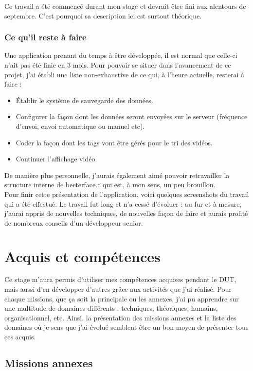 \documentclass[11pt,french,a4paper]{report}
\begin{document}
Ce travail a été commencé durant mon stage et devrait être fini aux alentours de septembre. C'est pourquoi sa description ici
est surtout théorique. \\
        \subsection{Ce qu'il reste à faire}
Une application prenant du temps à être développée, il est normal que celle-ci n'ait pas été finie en 3 mois. Pour pouvoir se situer
dans l'avancement de ce projet, j'ai établi une liste non-exhaustive de ce qui, à l'heure actuelle, resterai à faire : \\ 
\begin{itemize}
    \item Établir le système de sauvegarde des données.
    \item Configurer la façon dont les données seront envoyées sur le serveur (fréquence d'envoi, envoi automatique ou manuel etc).
    \item Coder la façon dont les tags vont être gérés pour le tri des vidéos. 
    \item Continuer l'affichage vidéo.
\end{itemize} 
De manière plus personnelle, j'aurais également aimé pouvoir retravailler la structure interne de beeterface.c qui est, à mon sens,
un peu brouillon. \\
Pour finir cette présentation de l'application, voici quelques screenshots du travail qui a été effectué.
Le travail fut long et n'a cessé d'évoluer : au fur et à mesure, j'aurai appris de nouvelles techniques, de nouvelles façon de faire 
et aurais profité de nombreux conseils d'un développeur senior. \\

\chapter{Acquis et compétences}
Ce stage m'aura permis d'utiliser mes compétences acquises pendant le DUT, mais aussi d'en développer d'autres grâce aux activités 
que j'ai réalisé. Pour chaque missions, que ça soit la principale ou les annexes, j'ai pu apprendre sur une multitude de domaines
différents : techniques, théoriques, humains, organisationnel, etc. 
Ainsi, la présentation des missions annexes et la liste des domaines où je sens que j'ai évolué semblent être un bon moyen 
de présenter tous ces acquis. 
\section{Missions annexes}
        
\end{document}
